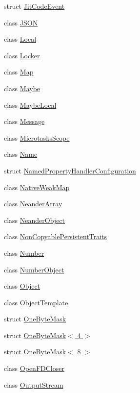\begin{DoxyCompactItemize}
\item 
struct \hyperlink{structv8_1_1_jit_code_event}{Jit\+Code\+Event}
\item 
class \hyperlink{classv8_1_1_j_s_o_n}{J\+S\+ON}
\item 
class \hyperlink{classv8_1_1_local}{Local}
\item 
class \hyperlink{classv8_1_1_locker}{Locker}
\item 
class \hyperlink{classv8_1_1_map}{Map}
\item 
class \hyperlink{classv8_1_1_maybe}{Maybe}
\item 
class \hyperlink{classv8_1_1_maybe_local}{Maybe\+Local}
\item 
class \hyperlink{classv8_1_1_message}{Message}
\item 
class \hyperlink{classv8_1_1_microtasks_scope}{Microtasks\+Scope}
\item 
class \hyperlink{classv8_1_1_name}{Name}
\item 
struct \hyperlink{structv8_1_1_named_property_handler_configuration}{Named\+Property\+Handler\+Configuration}
\item 
class \hyperlink{classv8_1_1_native_weak_map}{Native\+Weak\+Map}
\item 
class \hyperlink{classv8_1_1_neander_array}{Neander\+Array}
\item 
class \hyperlink{classv8_1_1_neander_object}{Neander\+Object}
\item 
class \hyperlink{classv8_1_1_non_copyable_persistent_traits}{Non\+Copyable\+Persistent\+Traits}
\item 
class \hyperlink{classv8_1_1_number}{Number}
\item 
class \hyperlink{classv8_1_1_number_object}{Number\+Object}
\item 
class \hyperlink{classv8_1_1_object}{Object}
\item 
class \hyperlink{classv8_1_1_object_template}{Object\+Template}
\item 
struct \hyperlink{structv8_1_1_one_byte_mask}{One\+Byte\+Mask}
\item 
struct \hyperlink{structv8_1_1_one_byte_mask_3_014_01_4}{One\+Byte\+Mask$<$ 4 $>$}
\item 
struct \hyperlink{structv8_1_1_one_byte_mask_3_018_01_4}{One\+Byte\+Mask$<$ 8 $>$}
\item 
class \hyperlink{classv8_1_1_open_f_d_closer}{Open\+F\+D\+Closer}
\item 
class \hyperlink{classv8_1_1_output_stream}{Output\+Stream}
\item 

\end{DoxyCompactItemize}
